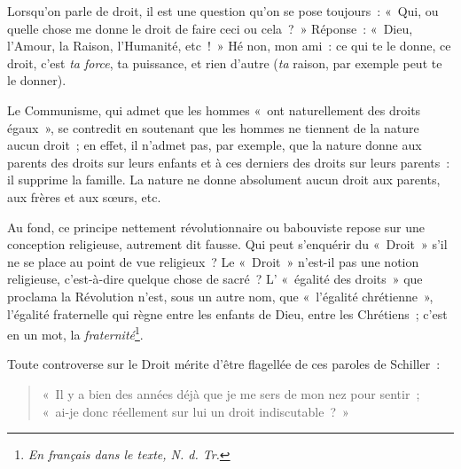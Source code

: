 \documentclass[french,twoside]{book} %
\begin{document}
Lorsqu’on parle de droit, il est une question qu’on se pose toujours : « Qui, ou quelle chose me donne le droit de faire ceci ou cela ? » Réponse : « Dieu, l’Amour, la Raison, l’Humanité, etc ! » Hé non, mon ami : ce qui te le donne, ce droit, c’est \emph{ta force}, ta puissance, et rien d’autre (\emph{ta} raison, par exemple peut te le donner).\par
Le Communisme, qui admet que les hommes « ont naturellement des droits égaux », se contredit en soutenant que les hommes ne tiennent de la nature aucun droit ; en effet, il n’admet pas, par exemple, que la nature donne aux parents des droits sur leurs enfants et à ces derniers des droits sur leurs parents : il supprime la famille. La nature ne donne absolument aucun droit aux parents, aux frères et aux sœurs, etc.\par
Au fond, ce principe nettement révolutionnaire ou babouviste repose sur une conception religieuse, autrement dit fausse. Qui peut s’enquérir du « Droit » s’il ne se place au point de vue religieux ? Le « Droit » n’est-il pas une notion religieuse, c’est-à-dire quelque chose de sacré ? L’ « égalité des droits » que proclama la Révolution n’est, sous un autre nom, que « l’égalité chrétienne », l’égalité fraternelle qui règne entre les enfants de Dieu, entre les Chrétiens ; c’est en un mot, la \emph{fraternité}\footnote{ \noindent \emph{En français dans le texte, N. d. Tr.}
 }.\par
 Toute controverse sur le Droit mérite d’être flagellée de ces paroles de Schiller :\par


\begin{verse}
« Il y a bien des années déjà que je me sers de mon nez pour sentir ;\\
« ai-je donc réellement sur lui un droit indiscutable ? »\\
\end{verse}
\end{document}
